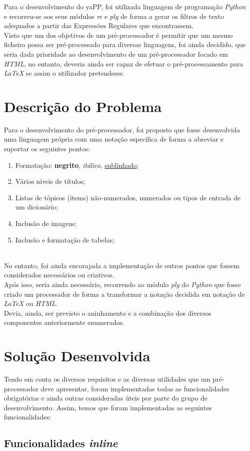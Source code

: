 \documentclass{article}
\begin{document}
 Para o desenvolvimento do yaPP, foi utilizada linguagem de programação \textit{Python} e recorreu-se aos seus módulos \textit{re} e \textit{ply} de forma a gerar os filtros de texto adequados a partir das Expressões Regulares que encontrassem.\\
 Visto que um dos objetivos de um pré-processador é permitir que um mesmo ficheiro possa ser pré-processado para diversas linguagens, foi ainda decidido, que seria dada prioridade ao desenvolvimento de um pré-processador focado em \textit{HTML}, no entanto, deveria ainda ser capaz de efetuar o pré-processamento para \textit{LaTeX} se assim o utilizador pretendesse.\section{Descrição do Problema}
Para o desenvolvimento do pré-processador, foi proposto que fosse desenvolvida uma linguagem própria com uma notação específica de forma a abreviar e suportar os seguintes pontos: 
\begin{enumerate}
\item Formatação: \textbf{negrito}, \textit{itálico}, \underline{sublinhado};
\item Vários níveis de títulos;
\item Listas de tópicos (items) não-numerados, numerados ou tipos de entrada de um dicionário;
\item Inclusão de imagens;
\item Inclusão e formatação de tabelas;
\end{enumerate}
\\
 No entanto, foi ainda encorajada a implementação de outros pontos que fossem considerados necessários ou criativos.\\
 Após isso, seria ainda necessário, recorrendo ao módulo \textit{ply} do \textit{Python} que fosse criado um processador de forma a transformar a notação decidida em notação de \textit{LaTeX} ou \textit{HTML}.\\
 Devia, ainda, ser previsto o aninhamento e a combinação dos diversos componentes anteriormente enumerados.\section{Solução Desenvolvida}
Tendo em conta os diversos requisitos e as diversas utilidades que um pré-processador deve apresentar, foram implementadas todas as funcionalidades obrigatórias e ainda outras consideradas úteis por parte do grupo de desenvolvimento. Assim, temos que foram implementadas as seguintes funcionalidades: \subsection{Funcionalidades \textit{inline}}
\end{document}

